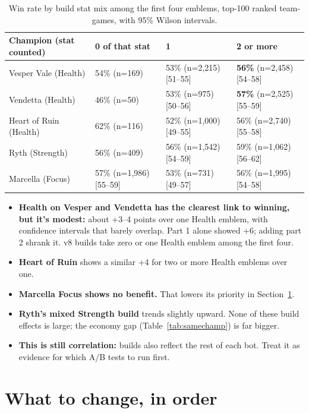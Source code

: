 \documentclass[11pt,a4paper]{article}
\begin{document}
\begin{table}[H]
\centering\footnotesize\setlength{\tabcolsep}{4pt}
\begin{tabular}{llll}
\toprule
Champion (stat counted) & 0 of that stat & 1 & 2 or more \\
\midrule
Vesper Vale (Health)   & 54\% (n=169)   & 53\% (n=2,215) [51--55] & \textbf{56\%} (n=2,458) [54--58] \\
Vendetta (Health)      & 46\% (n=50)    & 53\% (n=975) [50--56]   & \textbf{57\%} (n=2,525) [55--59] \\
Heart of Ruin (Health) & 62\% (n=116)   & 52\% (n=1,000) [49--55] & 56\% (n=2,740) [55--58] \\
Ryth (Strength)        & 56\% (n=409)   & 56\% (n=1,542) [54--59] & 59\% (n=1,062) [56--62] \\
Marcella (Focus)       & 57\% (n=1,986) [55--59] & 53\% (n=731) [49--57] & 56\% (n=1,995) [54--58] \\
\bottomrule
\end{tabular}
\caption{Win rate by build stat mix among the first four emblems, top-100 ranked team-games, with 95\% Wilson intervals.}
\label{tab:buildwin}
\end{table}

\begin{itemize}
  \item \textbf{Health on Vesper and Vendetta has the clearest link to winning, but it's modest:} about +3--4 points over one Health emblem, with confidence intervals that barely overlap. Part 1 alone showed +6; adding part 2 shrank it. v8 builds take zero or one Health emblem among the first four.
  \item \textbf{Heart of Ruin} shows a similar +4 for two or more Health emblems over one.
  \item \textbf{Marcella Focus shows no benefit.} That lowers its priority in Section~\ref{sec:fix}.
  \item \textbf{Ryth's mixed Strength build} trends slightly upward. None of these build effects is large; the economy gap (Table~\ref{tab:samechamp}) is far bigger.
  \item \textbf{This is still correlation:} builds also reflect the rest of each bot. Treat it as evidence for which A/B tests to run first.
\end{itemize}

\section{What to change, in order}
\label{sec:fix}
\end{document}
